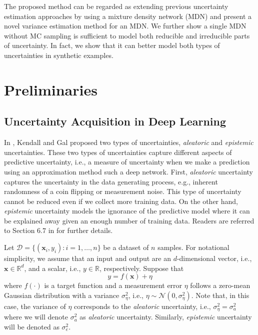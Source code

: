 \documentclass[letterpaper, 10 pt, conference]{ieeeconf}  %
\def\R{{\mathbb R}}
\begin{document}
The proposed method can be regarded as extending
previous uncertainty estimation approaches by using 
a mixture density network (MDN) 
and present a novel variance estimation method for an MDN. 
We further show a single MDN without MC sampling
is sufficient to model both reducible and irreducible parts of uncertainty. 
In fact, we show that it can better model both types of uncertainties
in synthetic examples. 


\section{Preliminaries} \label{sec:prel}

\subsection{Uncertainty Acquisition in Deep Learning} \label{subsec:unct_dl}

In \cite{Kendall_17}, Kendall and Gal proposed 
two types of uncertainties, 
\textit{aleatoric} and \textit{epistemic} uncertainties.
These two types of uncertainties capture different aspects of
predictive uncertainty, i.e., a measure of uncertainty
when we make a prediction using an approximation method 
such a deep network.
First, \textit{aleatoric} uncertainty captures the uncertainty in the
data generating process, e.g., inherent randomness
of a coin flipping or measurement noise. 
This type of uncertainty cannot be reduced 
even if we collect more training data. 
On the other hand, 
\textit{epistemic} uncertainty models the ignorance of
the predictive model where it can be explained away given 
an enough number of training data.
Readers are referred to Section $6.7$ in \cite{Gal_16_thesis} 
for further details. 


Let $\mathcal{D} = \{(\mathbf{x}_{i}, y_{i}) : i = 1, \ldots, n \}$
be a dataset of $n$ samples.
For notational simplicity, we assume that an input and output are
an $d$-dimensional vector, i.e., $\mathbf{x} \in \R^d$, and 
a scalar, i.e., $y \in \R$, respectively. 
Suppose that 
\begin{equation*}
	y=f(\mathbf{x})+\eta
\end{equation*}
where 
$f(\cdot)$ is a target function and 
a measurement error $\eta$ follows a zero-mean Gaussian 
distribution with a variance $\sigma^2_{\eta}$,
i.e., $\eta \sim \mathcal{N}(0, \sigma^2_{\eta})$.
Note that, in this case, 
the variance of $\eta$ corresponds to the \textit{aleatoric} uncertainty, i.e., 
$\sigma^2_{\eta}=\sigma^2_a$ where
we will denote $\sigma^2_a$ as \textit{aleatoric} uncertainty. 
Similarly, \textit{epistemic} uncertainty will be denoted as
$\sigma^2_e$.
\end{document}
